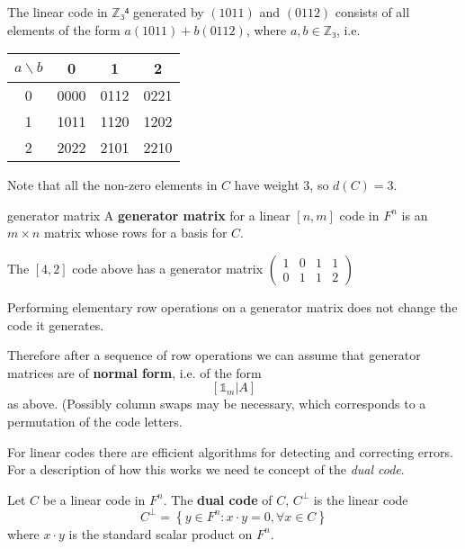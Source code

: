\documentclass[english]{lbscript}
\begin{document}
\begin{example}{}{}
	The linear code in \(ℤ₃⁴\) generated by \((1011)\) and \((0112)\) consists of all elements of the form \(a(1011)+b(0112)\), where \(a,b∈ℤ₃\), i.e.\\
	\begin{tabular}{c|ccc}
		\toprule
		\(a \backslash b\) & 0    & 1    & 2    \\
		\midrule
		0                  & 0000 & 0112 & 0221 \\
		1                  & 1011 & 1120 & 1202 \\
		2                  & 2022 & 2101 & 2210 \\
		\bottomrule
	\end{tabular}
	Note that all the non-zero elements in \(C\) have weight 3, so \(d(C)=3\).
\end{example}

\begin{definition}{generator matrix}{}
	A \textbf{generator matrix} for a linear \([n,m]\) code in \(F^{n}\) is an \(m×n\) matrix whose rows for a basis for \(C\).
\end{definition}

\begin{example}{}{}
	The \([4,2]\) code above has a generator matrix \(\begin{pmatrix}
		1 & 0 & 1 & 1 \\
		0 & 1 & 1 & 2
	\end{pmatrix}\)
\end{example}
\begin{remark}{}{}
	Performing elementary row operations on a generator matrix does not change the code it generates.
\end{remark}
Therefore after a sequence of row operations we can assume that generator matrices are of \textbf{normal form}, i.e. of the form
\begin{equation}
	\label{eq:139}
	\left[𝟙_{m} | A\right]
\end{equation}
as above. (Possibly column swaps may be necessary, which corresponds to a permutation of the code letters.

For linear codes there are efficient algorithms for detecting and correcting errors. For a description of how this works we need te concept of the \emph{dual code}.

\begin{definition}{}{}
	Let \(C\) be a linear code in \(F^{n}\). The \textbf{dual code} of \(C\), \(C^{⟂}\) is the linear code
	\begin{equation}
		\label{eq:140}
		C^{⟂}=\left\{ y∈F^{n}: x⋅y=0, ∀x∈C \right\}
	\end{equation}
	where \(x⋅y\) is the standard scalar product on \(F^{n}\).
\end{definition}
\end{document}
